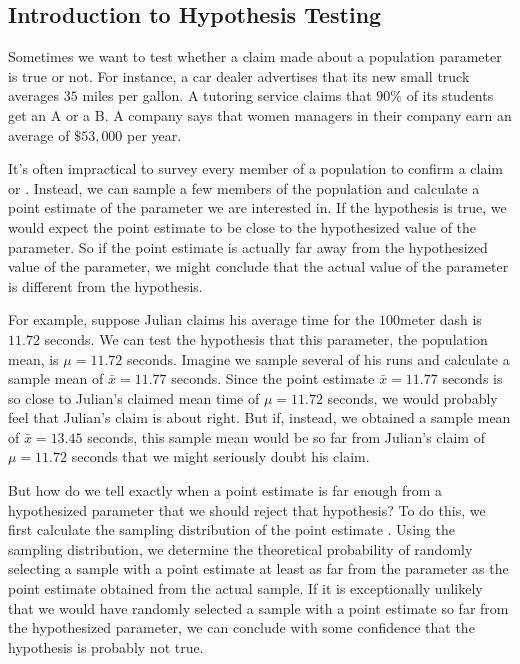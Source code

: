 \documentclass[letterpaper,10pt,english]{jupyterBook}
\begin{document}
\subsection{Introduction to Hypothesis Testing}
\label{\detokenize{Ch6 An Introduction to Hypothesis Testing/6.1 An Introduction to Hypothesis Testing:introduction-to-hypothesis-testing}}
\sphinxAtStartPar
Sometimes we want to test whether a claim made about a population parameter is true or not. For instance, a car dealer advertises that its new small truck averages \(35\) miles per gallon. A tutoring service claims that \(90\%\) of its students get an A or a B. A company says that women managers in their company earn an average of \(\$53{,}000\) per year.

\sphinxAtStartPar
It’s often impractical to survey every member of a population to confirm a claim or . Instead, we can sample a few members of the population and calculate a point estimate of the parameter we are interested in. If the hypothesis is true, we would expect the point estimate to be close to the hypothesized value of the parameter. So if the point estimate is actually far away from the hypothesized value of the parameter, we might conclude that the actual value of the parameter is different from the hypothesis.

\sphinxAtStartPar
For example, suppose Julian claims his average time for the \(100\)\sphinxhyphen{}meter dash is \(11.72\) seconds. We can test the hypothesis that this parameter, the population mean, is \(\mu = 11.72\) seconds. Imagine we sample several of his runs and calculate a sample mean of \(\bar{x} = 11.77\) seconds. Since the point estimate \(\bar{x} = 11.77\) seconds is so close to Julian’s claimed mean time of \(\mu = 11.72\) seconds, we would probably feel that Julian’s claim is about right. But if, instead, we obtained a sample mean of \(\bar{x} = 13.45\) seconds, this sample mean would be so far from Julian’s claim of \(\mu = 11.72\) seconds that we might seriously doubt his claim.

\sphinxAtStartPar
But how do we tell exactly when a point estimate is far enough from a hypothesized parameter that we should reject that hypothesis? To do this, we first calculate the sampling distribution of the point estimate . Using the sampling distribution, we determine the theoretical probability of randomly selecting a sample with a point estimate at least as far from the parameter as the point estimate obtained from the actual sample. If it is exceptionally unlikely that we would have randomly selected a sample with a point estimate so far from the hypothesized parameter, we can conclude with some confidence that the hypothesis is probably not true.
\end{document}
